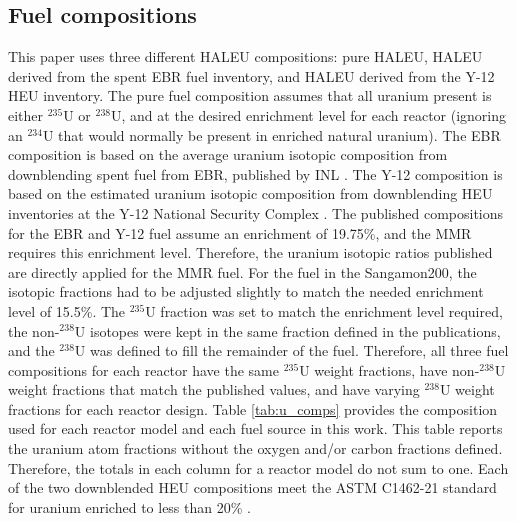 \subsection{Fuel compositions}
This paper uses three different \gls*{HALEU} compositions: pure 
\gls*{HALEU}, \gls*{HALEU} derived from the spent \gls*{EBR} fuel inventory, 
and \gls*{HALEU} derived from the Y-12 \gls*{HEU} 
inventory. The pure fuel composition assumes that all uranium present is 
either $^{235}$U or $^{238}$U, and at the desired enrichment level for each 
reactor (ignoring an $^{234}$U that would normally be present in 
enriched natural uranium). The \gls*{EBR} 
composition is based on the average uranium isotopic composition from 
downblending spent fuel from \gls*{EBR}, published by \gls*{INL} 
\cite{vaden_isotopic_2018}. The Y-12 composition is based on the 
estimated uranium isotopic composition from downblending \gls*{HEU} 
inventories at the Y-12 National Security Complex \cite{nelson_foreign_2010}.
The published compositions for the \gls*{EBR} and Y-12 fuel 
assume an enrichment 
of 19.75\%, and the \gls*{MMR} requires this enrichment level. 
Therefore, the uranium isotopic ratios 
published are directly applied for the \gls*{MMR} fuel. For the fuel in the 
Sangamon200, the isotopic fractions had to be adjusted slightly to match the 
needed enrichment level of 15.5\%. The $^{235}$U fraction was set to match 
the 
enrichment level required, the non-$^{238}$U isotopes were kept in the 
same fraction defined in the publications, and the $^{238}$U was 
defined to fill the remainder of the fuel. Therefore, all 
three fuel compositions for each 
reactor have the same $^{235}$U weight fractions, have non-$^{238}$U 
weight
fractions that match the published values, and have varying $^{238}$U 
weight fractions for each reactor design. Table \ref{tab:u_comps} 
provides the composition used for each reactor model and each fuel source 
in this work. This table reports the uranium atom fractions 
without the oxygen 
and/or carbon fractions defined. Therefore, the totals in each 
column for a reactor model do not sum to one. Each of the two 
downblended \gls*{HEU} compositions meet the ASTM C1462-21 
standard for 
uranium enriched to less than 20\% \cite{noauthor_standard_2021}.

